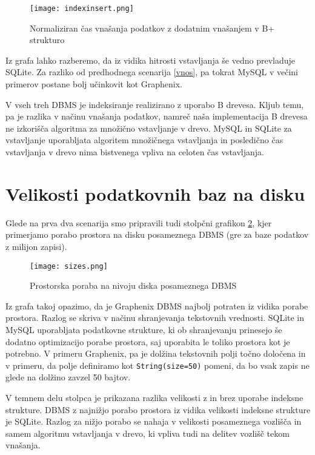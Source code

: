\documentclass[a4paper,12pt,openright]{book}
\begin{document}
    \begin{figure}[H]
        \centerline{\texttt{[image: indexinsert.png]}}
        \caption{Normaliziran čas vnašanja podatkov z dodatnim vnašanjem v B+ strukturo}
        \label{index_vnos}
    \end{figure}

    \noindent
    Iz grafa lahko razberemo, da iz vidika hitrosti vstavljanja še vedno prevladuje SQLite. Za razliko od predhodnega scenarija \ref{vnos}, pa tokrat MySQL v večini primerov postane bolj učinkovit kot Graphenix.

    V vseh treh DBMS je indeksiranje realizirano z uporabo B drevesa. Kljub temu, pa je razlika v načinu vnašanja podatkov, namreč naša implementacija B drevesa ne izkorišča algoritma za množično vstavljanje v drevo. MySQL in SQLite za vstavljanje uporabljata algoritem množičnega vstavljanja in posledično čas vstavljanja v drevo nima bistvenega vpliva na celoten čas vstavljanja.
 
    \section{Velikosti podatkovnih baz na disku}
    \label{size_analysis}

    Glede na prva dva scenarija smo pripravili tudi stolpčni grafikon \ref{velikosti}, kjer primerjamo porabo prostora na disku posameznega DBMS (gre za baze podatkov z milijon zapisi). 
    
    \begin{figure}[H]
        \centerline{\texttt{[image: sizes.png]}}
        \caption{Prostorska poraba na nivoju diska posameznega DBMS}
        \label{velikosti}
    \end{figure}

    \noindent
    Iz grafa takoj opazimo, da je Graphenix DBMS najbolj potraten iz vidika porabe prostora. Razlog se skriva v načinu shranjevanja tekstovnih vrednosti. SQLite in MySQL uporabljata podatkovne strukture, ki ob shranjevanju prinesejo še dodatno optimizacijo porabe prostora, saj uporabita le toliko prostora kot je potrebno. V primeru Graphenix, pa je dolžina tekstovnih polji točno določena in v primeru, da polje definiramo kot {\tt String(size=50)} pomeni, da bo vsak zapis ne glede na dolžino zavzel 50 bajtov.

    V temnem delu stolpca je prikazana razlika velikosti z in brez uporabe indeksne strukture. DBMS z najnižjo porabo prostora iz vidika velikosti indeksne strukture je SQLite. Razlog za nižjo porabo se nahaja v velikosti posameznega vozlišča in samem algoritmu vstavljanja v drevo, ki vpliva tudi na delitev vozlišč tekom vnašanja.
\end{document}
